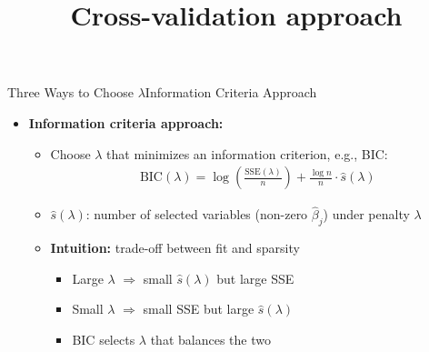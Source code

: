 \documentclass[hyperref={pdfpagelabels=false}]{beamer}
\begin{document}
\begin{frame}{Three Ways to Choose $\lambda$}{Information Criteria Approach}
    \begin{itemize}
        \item[3] \textbf{Information criteria approach:}
        \vspace{0.2cm}
        \begin{itemize}
            \item Choose $\lambda$ that minimizes an information criterion, 
            e.g., BIC:
            \vspace{0.2cm}
            \begin{eqnarray*}
                \text{BIC}(\lambda) = \log\left(\frac{\text{SSE}(\lambda)}{n}\right) 
                + \frac{\log n}{n} \cdot \hat{s}(\lambda)
            \end{eqnarray*}
            \vspace{0.1cm}
            \item $\hat{s}(\lambda)$: number of selected variables 
            (non-zero $\hat{\beta}_j$) under penalty $\lambda$
            \vspace{0.2cm}
            \item \textbf{Intuition:} trade-off between fit and sparsity
            \begin{itemize}
                \vspace{0.1cm}
                \item Large $\lambda$ $\Rightarrow$ small $\hat{s}(\lambda)$ 
                but large SSE
                \vspace{0.1cm}
                \item Small $\lambda$ $\Rightarrow$ small SSE 
                but large $\hat{s}(\lambda)$
                \vspace{0.1cm}
                \item BIC selects $\lambda$ that balances the two
            \end{itemize}
        \end{itemize}
    \end{itemize}
\end{frame}



\title[]  
{Cross-validation approach}


\author 
{}

\institute{}
\end{document}
